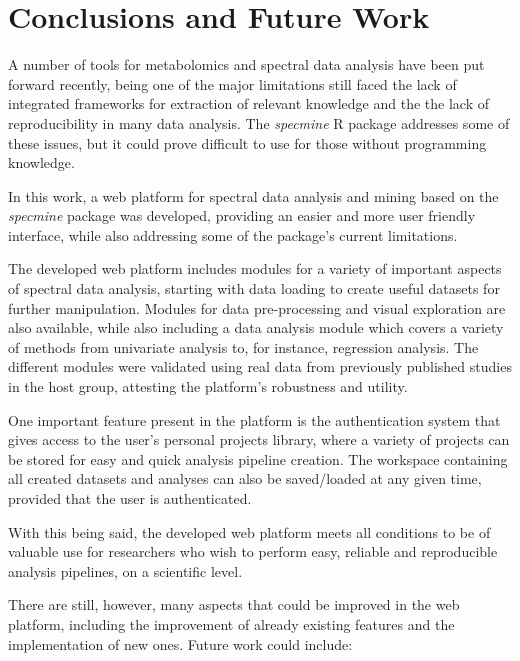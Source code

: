 
\chapter{Conclusions and Future Work}

A number of tools for metabolomics and spectral data analysis have been put forward recently, being one of the major limitations still faced the lack of integrated frameworks for extraction of relevant knowledge and the the lack of reproducibility in many data analysis. The \textit{specmine} R package addresses some of these issues, but it could prove difficult to use for those without programming knowledge. 

In this work, a web platform for spectral data analysis and mining based on the \textit{specmine} package was developed, providing an easier and more user friendly interface, while also addressing some of the package's current limitations.

The developed web platform includes modules for a variety of important
aspects of spectral data analysis, starting with data loading to create useful datasets for further manipulation. Modules for data pre-processing and visual exploration are also available, while also including a data analysis module which covers a variety of methods from univariate analysis to, for instance, regression analysis. The different modules were validated using real data from previously published studies in the host group, attesting the platform's robustness and utility.

One important feature present in the platform is the authentication system that gives access to the user's personal projects library, where a variety of projects can be stored for easy and quick analysis pipeline creation. The workspace containing all created datasets and analyses can also be saved/loaded at any given time, provided that the user is authenticated.

With this being said, the developed web platform meets all conditions to be of valuable use for researchers who wish to perform easy, reliable and reproducible analysis pipelines, on a scientific level.

There are still, however, many aspects that could be improved in the web platform, including the improvement of already existing features and the implementation of new ones. Future work could include:



